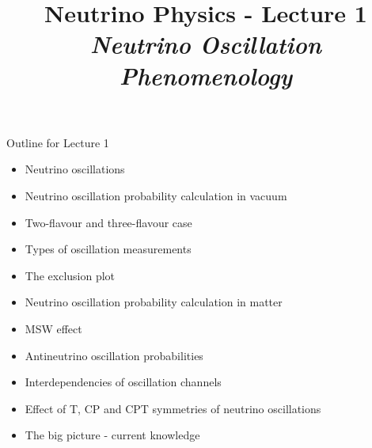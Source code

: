 \renewcommand{\thislecture}{1 }

%
%

\title[Neutrino Physics / Lecture \thislecture]
{
  {\huge \color{yellow} Neutrino Physics - Lecture \thislecture} \\
  {\it Neutrino Oscillation Phenomenology}\\
}



\begin{frame}[plain]
  \titlepage
\end{frame}

%
%

\begin{frame}{Outline for Lecture \thislecture}

\begin{itemize}
  \item Neutrino oscillations
  \item Neutrino oscillation probability calculation in vacuum
  \item Two-flavour and three-flavour case
  \item Types of oscillation measurements
  \item The exclusion plot
  \item Neutrino oscillation probability calculation in matter
  \item MSW effect
  \item Antineutrino oscillation probabilities
  \item Interdependencies of oscillation channels
  \item Effect of T, CP and CPT symmetries of neutrino oscillations
  \item The big picture - current knowledge
\end{itemize}

\end{frame}

%
%
%

